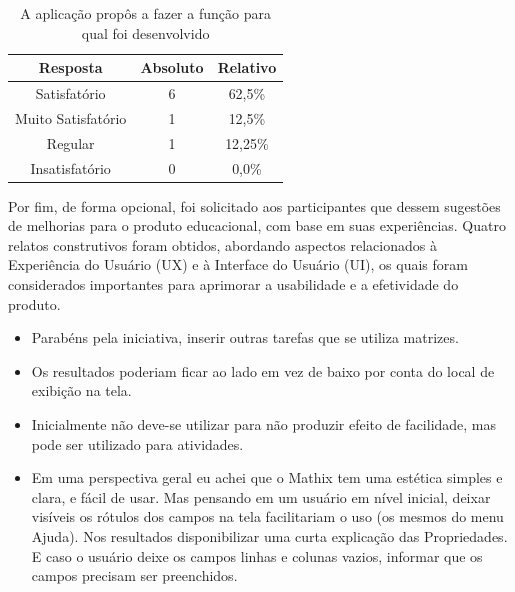 \begin{table}[h!]
    \centering
    \caption{A aplicação propôs a fazer a função para qual foi desenvolvido}
    \begin{tabular}{c|c|c}
        \textbf{Resposta} &	\textbf{Absoluto} & \textbf{Relativo} \\
        \hline
        Satisfatório & 6 & 62,5\% \\
        \hline
        Muito Satisfatório & 1 & 12,5\% \\
        \hline
        Regular & 1 & 12,25\% \\
        \hline
        Insatisfatório & 0 & 0,0\% \\
    \end{tabular}
    \label{tab:p5}
\end{table}




Por fim, de forma opcional, foi solicitado aos participantes que dessem sugestões de melhorias para o produto educacional, com base em suas experiências. Quatro relatos construtivos foram obtidos, abordando aspectos relacionados à Experiência do Usuário (UX) e à Interface do Usuário (UI), os quais foram considerados importantes para aprimorar a usabilidade e a efetividade do produto.


\begin{itemize}

    \item Parabéns pela iniciativa, inserir outras tarefas que se utiliza matrizes.

    \item Os resultados poderiam ficar ao lado em vez de baixo por conta do local de exibição na tela.

    \item Inicialmente não deve-se utilizar para não produzir efeito de facilidade, mas pode ser utilizado para atividades.

    \item Em uma perspectiva geral eu achei que o Mathix tem uma estética simples e clara, e fácil de usar. Mas pensando em um usuário em nível inicial, deixar visíveis os rótulos dos campos na tela facilitariam o uso (os mesmos do menu Ajuda). Nos resultados disponibilizar uma curta explicação das Propriedades. E caso o usuário deixe os campos linhas e colunas vazios, informar que os campos precisam ser preenchidos.

\end{itemize}




